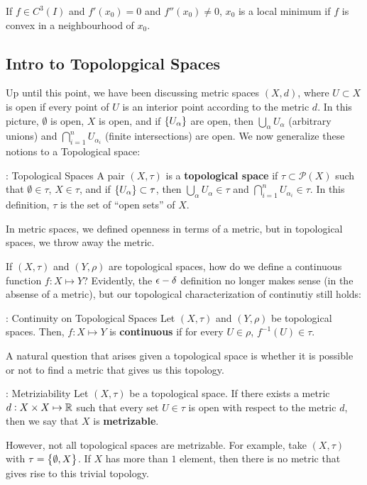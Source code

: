\begin{ncorollary}{}{}
    If $f \in C^3(I)$ and $f'(x_0) = 0$ and $f''(x_0) \neq 0$, $x_0$ is a local minimum if $f$ is convex in a neighbourhood of $x_0$. 
\end{ncorollary}

\subsection{Intro to Topolopgical Spaces}
Up until this point, we have been discussing metric spaces $(X, d)$, where $U \subset X$ is open if every point of $U$ is an interior point according to the metric $d$. In this picture, $\emptyset$ is open, $X$ is open, and if $\set{U_\alpha}$ are open, then $\bigcup_{\alpha} U_\alpha$ (arbitrary unions) and $\bigcap_{i=1}^n U_{\alpha_i}$ (finite intersections) are open. We now generalize these notions to a Topological space:

\begin{ndef}{: Topological Spaces}{}
    A pair $(X, \tau)$ is a \textbf{topological space} if $\tau \subset \mathcal{P}(X)$ such that $\emptyset \in \tau$, $X \in \tau$, and if $\set{U_\alpha} \subset \tau$, then $\bigcup_{\alpha} U_\alpha \in \tau$ and $\bigcap_{i=1}^n U_{\alpha_i} \in \tau$. In this definition, $\tau$ is the set of ``open sets'' of $X$.
\end{ndef}
\noindent In metric spaces, we defined openness in terms of a metric, but in topological spaces, we throw away the metric.

If $(X, \tau)$ and $(Y, \rho)$ are topological spaces, how do we define a continuous function $f: X \mapsto Y$? Evidently, the $\epsilon-\delta$ definition no longer makes sense (in the absense of a metric), but our topological characterization of continutiy still holds:

\begin{ndef}{: Continuity on Topological Spaces}{}
    Let $(X, \tau)$ and $(Y, \rho)$ be topological spaces. Then, $f: X \mapsto Y$ is \textbf{continuous} if for every $U \in \rho$, $f^{-1}(U) \in \tau$. 
\end{ndef}

\noindent A natural question that arises given a topological space is whether it is possible or not to find a metric that gives us this topology. 

\begin{ndef}{: Metriziability}{}
    Let $(X, \tau)$ be a topological space. If there exists a metric $d: X \times X \mapsto \mathbb{R}$ such that every set $U \in \tau$ is open with respect to the metric $d$, then we say that $X$ is \textbf{metrizable}.
\end{ndef}
\noindent However, not all topological spaces are metrizable. For example, take $(X, \tau)$ with $\tau = \set{\emptyset, X}$. If $X$ has more than $1$ element, then there is no metric that gives rise to this trivial topology.

